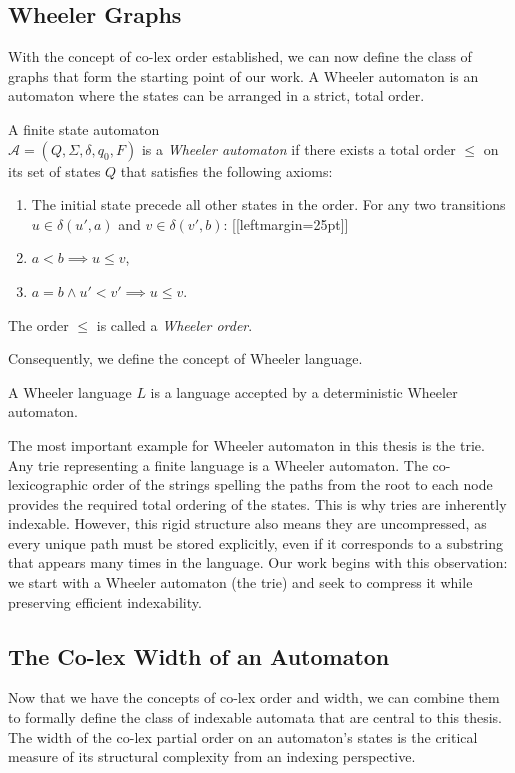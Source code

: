 \subsection{Wheeler Graphs}
With the concept of co-lex order established, we can now define the class of graphs that form the starting point of our work. A Wheeler automaton is an automaton where the states can be arranged in a strict, total order.

\begin{definition}
    \label{def:wheeler_automaton}
    A finite state automaton \\
    $\mathcal{A} = (Q, \Sigma, \delta, q_0, F)$ is a \textit{Wheeler automaton} if there exists a total order $\leq$ on its set of states $Q$ that satisfies the following axioms:
    \begin{enumerate}[leftmargin=25pt]
        \item The initial state precede all other states in the order.
    For any two transitions $u \in \delta(u', a)$ and $v \in \delta(v', b)$:
    [{[leftmargin=25pt]}]
        \item $a<b \implies u \leq v$,
        \item $a=b \wedge u' < v' \implies u \leq v$.
    \end{enumerate}
    The order $\leq$ is called a \textit{Wheeler order}.
\end{definition}

Consequently, we define the concept of Wheeler language.
\begin{definition}
    A Wheeler language $L$ is a language accepted by a deterministic Wheeler automaton.
\end{definition}

The most important example for Wheeler automaton in this thesis is the trie. Any trie representing a finite language is a Wheeler automaton. The co-lexicographic order of the strings spelling the paths from the root to each node provides the required total ordering of the states. This is why tries are inherently indexable. However, this rigid structure also means they are uncompressed, as every unique path must be stored explicitly, even if it corresponds to a substring that appears many times in the language. Our work begins with this observation: we start with a Wheeler automaton (the trie) and seek to compress it while preserving efficient indexability.

\subsection{The Co-lex Width of an Automaton}
Now that we have the concepts of co-lex order and width, we can combine them to formally define the class of indexable automata that are central to this thesis. The width of the co-lex partial order on an automaton's states is the critical measure of its structural complexity from an indexing perspective.

